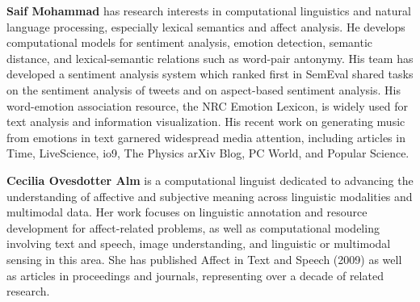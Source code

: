 \begin{bio}

\textbf{Saif Mohammad} has research interests in computational linguistics
and natural language processing, especially lexical semantics and
affect analysis. He develops computational models for sentiment analysis,
emotion detection, semantic distance, and lexical-semantic relations
such as word-pair antonymy. His team has developed a sentiment analysis
system which ranked first in SemEval shared tasks on the sentiment
analysis of tweets and on aspect-based sentiment analysis. His word-emotion
association resource, the NRC Emotion Lexicon, is widely used for
text analysis and information visualization. His recent work on generating
music from emotions in text garnered widespread media attention, including
articles in Time, LiveScience, io9, The Physics arXiv Blog, PC World,
and Popular Science.

\textbf{Cecilia Ovesdotter Alm} is a computational linguist dedicated
to advancing the understanding of affective and subjective meaning
across linguistic modalities and multimodal data. Her work focuses
on linguistic annotation and resource development for affect-related
problems, as well as computational modeling involving text and speech,
image understanding, and linguistic or multimodal sensing in this
area. She has published Affect in Text and Speech (2009) as well as
articles in proceedings and journals, representing over a decade of
related research.

  

\end{bio}

